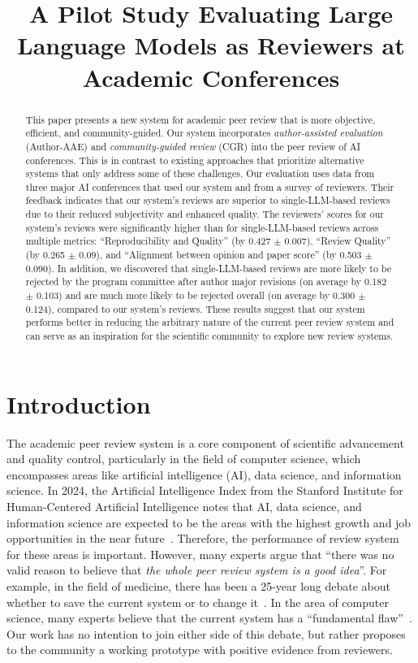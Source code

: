 
\title{A Pilot Study Evaluating Large Language Models as Reviewers at Academic Conferences}

\begin{abstract}
This paper presents a new system for academic peer review that is more objective, efficient, and community-guided. Our system incorporates \emph{author-assisted evaluation} (Author-AAE) and \emph{community-guided review} (CGR) into the peer review of AI conferences. This is in contrast to existing approaches that prioritize alternative systems that only address some of these challenges. Our evaluation uses data from three major AI conferences that used our system and from a survey of reviewers. Their feedback indicates that our system's reviews are superior to single-LLM-based reviews due to their reduced subjectivity and enhanced quality. The reviewers' scores for our system's reviews were significantly higher than for single-LLM-based reviews across multiple metrics: ``Reproducibility and Quality'' (by 0.427 $\pm$ 0.007), ``Review Quality'' (by 0.265 $\pm$ 0.09), and ``Alignment between opinion and paper score'' (by 0.503 $\pm$ 0.090). 
In addition, we discovered that single-LLM-based reviews are more likely to be rejected by the program committee after author major revisions (on average by 0.182 $\pm$ 0.103) and are much more likely to be rejected overall (on average by 0.300 $\pm$ 0.124), compared to our system's reviews. These results suggest that our system performs better in reducing the arbitrary nature of the current peer review system and can serve as an inspiration for the scientific community to explore new review systems. 
\end{abstract}

\section{Introduction}


\label{sec:intro}

The academic peer review system is a core component of scientific advancement and quality control, particularly in the field of computer science, which encompasses areas like artificial intelligence (AI), data science, and information science. In 2024, the Artificial Intelligence Index from the Stanford Institute for Human-Centered Artificial Intelligence notes that AI, data science, and information science are expected to be the areas with the highest growth and job opportunities in the near future~\citep{AIindexreport}. Therefore, the performance of review system for these areas is important. However, many experts argue that ``there was no valid reason to believe that \textit{the whole peer review system is a good idea}''. For example, in the field of medicine, there has been a 25-year long debate about whether to save the current system or to change it~\citep{van2012intended}. In the area of computer science, many experts believe that the current system has a ``fundamental flaw''~\citep{shah2022challenges, nicholson2016brief, tran2020open}. Our work has no intention to join either side of this debate, but rather proposes to the community a working prototype with positive evidence from reviewers.

